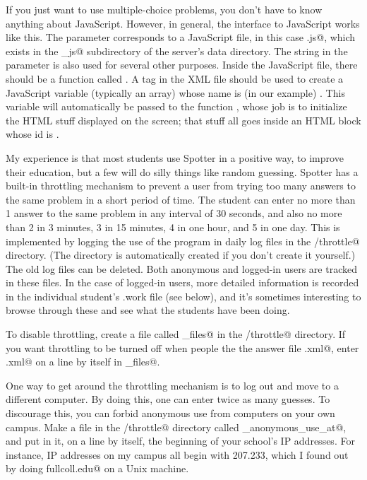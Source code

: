 \documentclass{doc}
\begin{document}
If you just want to use multiple-choice problems, you don't have to know anything
about JavaScript. However, in general, the interface to JavaScript works like this. The \verb@type@
parameter corresponds to a JavaScript file, in this case \verb@mc.js@, which
exists in the \verb@spotter_js@ subdirectory of the server's data directory.
The string in the \verb@type@ parameter is also used for several other purposes.
Inside the JavaScript file, there should be a function called \verb@populate@.
A \verb@data@ tag in the XML file should be used to create a JavaScript variable
(typically an array) whose name is (in our example) \verb@mc@. This variable
will automatically be passed to the function \verb@populate@, whose job is to
initialize the HTML stuff displayed on the screen; that stuff all goes inside
an HTML \verb@div@ block whose id is \verb@container@.

\label{abuse}
My experience is that most students use Spotter in a positive way, to improve their
education, but a few will do silly things like random guessing. Spotter
has a built-in throttling mechanism to prevent a user from trying too many
answers to the same problem in a short period of time. The student can enter
no more than 1 answer to the same problem in any interval of 30 seconds, and also no more than 2
in 3 minutes, 3 in 15 minutes, 4 in one hour, and 5 in one day.
This is implemented by logging the use of the program in daily log files
in the \verb@spotter/throttle@ directory. (The directory is automatically created
if you don't create it yourself.) The old log files can be deleted. Both
anonymous and logged-in users are tracked in these files. In the case of
logged-in users, more detailed information is recorded in the individual
student's .work file (see below), and it's sometimes interesting to browse
through these and see what the students have been doing.

To disable throttling, create a file called \verb@exempt_files@ in the
\verb@spotter/throttle@ directory. If you want throttling to be turned
off when people the the answer file \verb@foo.xml@, enter \verb@foo.xml@
on a line by itself in \verb@exempt_files@.

One way to get around the throttling mechanism is to log out and move to
a different computer. By doing this, one can enter twice as many guesses.
To discourage this, you can forbid anonymous use from computers on your
own campus. Make a file in the \verb@spotter/throttle@ directory called
\verb@forbid_anonymous_use_at@, and put in it, on a line by itself,
the beginning of your school's IP addresses. For instance, IP
addresses on my campus all begin with 207.233, which I found out by
doing \verb@dig fullcoll.edu@ on a Unix machine.
\end{document}
